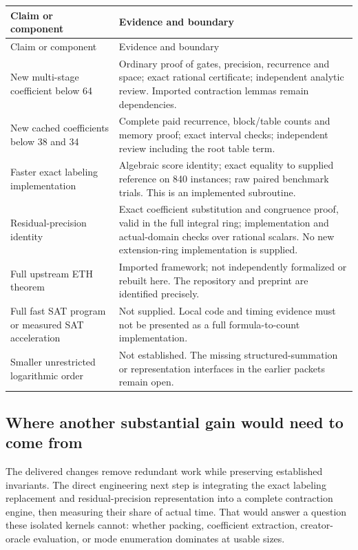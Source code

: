 \begin{longtable}{@{}>{\raggedright\arraybackslash}p{}>{\raggedright\arraybackslash}p{}@{}}
\toprule Claim or component & Evidence and boundary\\\midrule\endfirsthead
\toprule Claim or component & Evidence and boundary\\\midrule\endhead
New multi-stage coefficient below 64 &
Ordinary proof of gates, precision, recurrence and space; exact rational
certificate; independent analytic review. Imported contraction lemmas remain dependencies.\\[4pt]
New cached coefficients below 38 and 34 &
Complete paid recurrence, block/table counts and memory proof; exact
interval checks; independent review including the root table term.\\[4pt]
Faster exact labeling implementation &
Algebraic score identity; exact equality to supplied reference on 840
instances; raw paired benchmark trials. This is an implemented subroutine.\\[4pt]
Residual-precision identity &
Exact coefficient substitution and congruence proof, valid in the full
integral ring; implementation and actual-domain checks over rational scalars.
No new extension-ring implementation is supplied.\\[4pt]
Full upstream ETH theorem &
Imported framework; not independently formalized or rebuilt here. The
repository and preprint are identified precisely.\\[4pt]
Full fast SAT program or measured SAT acceleration &
Not supplied. Local code and timing evidence must not be presented as a
full formula-to-count implementation.\\[4pt]
Smaller unrestricted logarithmic order &
Not established. The missing structured-summation or representation
interfaces in the earlier packets remain open.\\\bottomrule
\end{longtable}

\subsection{Where another substantial gain would need to come from}

The delivered changes remove redundant work while preserving established
invariants. The direct engineering next step is integrating the exact
labeling replacement and residual-precision representation into a complete
contraction engine, then measuring their share of actual time. That would
answer a question these isolated kernels cannot: whether packing,
coefficient extraction, creator-oracle evaluation, or mode enumeration
dominates at usable sizes.

